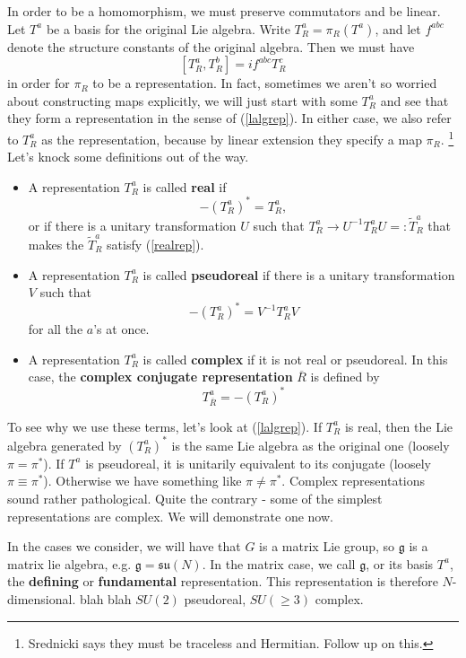 \documentclass{book}
\begin{document}
In order to be a homomorphism, we must preserve commutators and be linear. Let $T^a$ be a basis for the original Lie algebra. Write $T^a_R = \pi_R (T^a)$, and let $f^{abc}$ denote the structure constants of the original algebra. Then we must have
\begin{equation} \label{lalgrep}
[T^a_R,T^b_R] = i f^{abc} T^c_R
\end{equation}
in order for $\pi_R$ to be a representation. In fact, sometimes we aren't so worried about constructing maps explicitly, we will just start with some $T^a_R$ and see that they form a representation in the sense of (\ref{lalgrep}). In either case, we also refer to $T^a_R$ as the representation, because by linear extension they specify a map $\pi_R$. \footnote{Srednicki says they must be traceless and Hermitian. Follow up on this.} Let's knock some definitions out of the way.
\begin{itemize}
\item A representation $T^a_R$ is called \textbf{real} if 
\begin{equation} \label{realrep}
- (T^a_R)^* = T^a_R,
\end{equation}
or if there is a unitary transformation $U$ such that $T^a_R \to U^{-1} T^a_R U =: \tilde{T}^a_R$ that makes the $\tilde{T}^a_R$ satisfy (\ref{realrep}).
\item A representation $T^a_R$ is called \textbf{pseudoreal} if there is a unitary transformation $V$ such that
\[
-(T^a_R)^* = V^{-1} T^a_R V
\]
for all the $a$'s at once.
\item A representation $T^a_R$ is called \textbf{complex} if it is not real or pseudoreal. In this case, the \textbf{complex conjugate representation} $\overline{R}$ is defined by
\[
T^a_{\overline{R}} = - \left( T^a_R \right)^*
\]
\end{itemize}
To see why we use these terms, let's look at (\ref{lalgrep}). If $T^a_R$ is real, then the Lie algebra generated by $(T^a_R)^*$ is the same Lie algebra as the original one (loosely $\pi = \pi^*$). If $T^a$ is pseudoreal, it is unitarily equivalent to its conjugate (loosely $\pi \equiv \pi^*$). Otherwise we have something like $\pi \neq \pi^*$. Complex representations sound rather pathological. Quite the contrary - some of the simplest representations are complex. We will demonstrate one now.

In the cases we consider, we will have that $G$ is a matrix Lie group, so $\mathfrak{g}$ is a matrix lie algebra, e.g. $\mathfrak{g} = \mathfrak{su}(N)$. In the matrix case, we call $\mathfrak{g}$, or its basis $T^a$, the \textbf{defining} or \textbf{fundamental} representation. This representation is therefore $N$-dimensional. blah blah $SU(2)$ pseudoreal, $SU(\geq 3)$ complex. 
\end{document}
